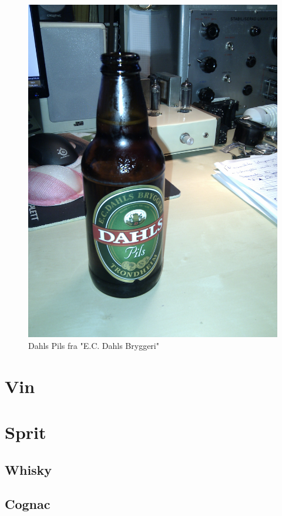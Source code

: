 \documentclass[12pt,a4paper,oneside,norsk]{article}
\begin{document}
\begin{figure} [H]
\centering
\includegraphics[scale=0.1, angle=0]{Bilder/Ol/dahls.jpg}
\caption{Dahls Pils fra "E.C. Dahls Bryggeri"}
\end{figure}

\newpage
\section{Vin}

\newpage
\section{Sprit}
\subsection{Whisky}

\newpage
\subsection{Cognac}
\end{document}
